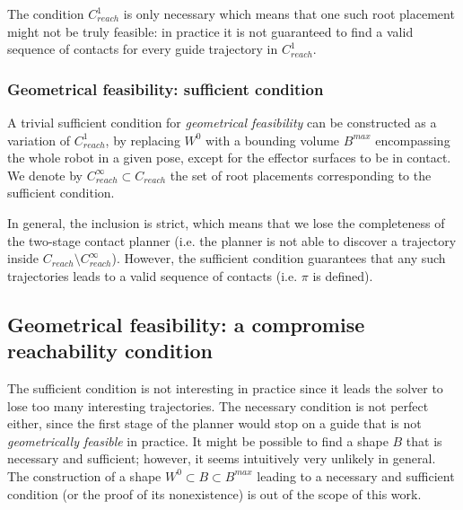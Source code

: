 The condition $C_{reach}^1$ is only necessary which means that one such root placement might not be truly feasible: in practice it is not guaranteed to find a valid sequence of contacts for every guide trajectory in $C_{reach}^1$.

\subsubsection*{Geometrical feasibility: sufficient condition}
A trivial sufficient condition for \textit{geometrical feasibility} can be constructed as a variation of $C_{reach}^1$, by replacing $W^0$ with a bounding volume $B^{max}$ encompassing the whole robot in a given pose, except for the effector surfaces to be in contact. We denote by \mbox{$C_{reach}^\infty \subset C_{reach}$} the set of root placements corresponding to the sufficient condition.

In general, the inclusion is strict, which means that we lose the completeness of the two-stage contact planner (i.e. the planner is not able to discover a trajectory inside \mbox{$C_{reach} \setminus C_{reach}^\infty$}). However, the sufficient condition guarantees that any such trajectories leads to a valid sequence of contacts (i.e. $\pi$ is defined).

\subsection{Geometrical feasibility: a compromise reachability condition}
The sufficient condition is not interesting in practice since it leads the solver to lose too many interesting trajectories. The necessary condition is not perfect either, since the first stage of the planner would stop on a guide that is not \textit{geometrically feasible} in practice. It might be possible to find a shape $B$ that is necessary and sufficient; however, it seems intuitively very unlikely in general. The construction of a shape $W^0 \subset B \subset B^{max}$ leading to a necessary and sufficient condition (or the proof of its nonexistence) is out of the scope of this work.

